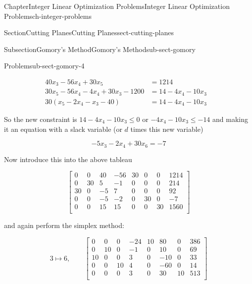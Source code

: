 \documentclass[oneside,10pt,]{book}
\numberwithin{equation}{section}
\newcommand{\amp}{&}
\begin{document}
\begin{chapterptx}{Chapter}{Integer Linear Optimization Problems}{}{Integer Linear Optimization Problems}{}{}{ch-integer-problems}
\begin{sectionptx}{Section}{Cutting Planes}{}{Cutting Planes}{}{}{sect-cutting-planes}
\begin{subsectionptx}{Subsection}{Gomory's Method}{}{Gomory's Method}{}{}{sub-sect-gomory}
\begin{problem}{Problem}{}{sub-sect-gomory-4}
\par
%
\begin{align*}
40 x_3-56 x_4 + 30 x_5 \amp = 1214 \\
30 x_5 -56x_4 -4 x_4 + 30 x_3 - 1200 \amp = 14 - 4x_4 - 10 x_3 \\
30 (x_5 - 2x_4 -x_3 -40) \amp = 14 - 4 x_4 - 10 x_3 \amp
\end{align*}
%
\par
So the new constraint is \(14 - 4 x_{4} - 10 x_{3} \leq 0\) or \(-4 x_{4} -10x_{3} \leq -14\) and making it an equation with a slack variable (or \(d\) times this new variable)%
\par
%
\begin{equation*}
-5 x_3 - 2x_4 + 30 x_6 = -7
\end{equation*}
%
\par
Now introduce this into the above tableau%
\par
%
\begin{equation*}
\left[\begin{array}{rr|rrrrr|r} 0 \amp 0 \amp 40 \amp -56 \amp 30 \amp 0 \amp 0 \amp 1214\\ 0 \amp 30 \amp 5 \amp -1 \amp 0 \amp 0 \amp 0 \amp 214\\ 30 \amp 0 \amp -5 \amp 7 \amp 0 \amp 0 \amp 0 \amp 92\\ 0 \amp 0 \amp -5 \amp -2 \amp 0 \amp 30 \amp 0 \amp -7\\ \hline 0 \amp 0 \amp 15 \amp 15 \amp 0 \amp 0 \amp 30 \amp 1560\\ \end{array} \right]
\end{equation*}
%
\par
and again perform the simplex method:%
\par
%
\begin{equation*}
3 \mapsto 6, \qquad \left[\begin{array}{rr|rrrrr|r} 0 \amp 0 \amp 0 \amp -24 \amp 10 \amp 80 \amp 0 \amp 386\\ 0 \amp 10 \amp 0 \amp -1 \amp 0 \amp 10 \amp 0 \amp 69\\ 10 \amp 0 \amp 0 \amp 3 \amp 0 \amp -10 \amp 0 \amp 33\\ 0 \amp 0 \amp 10 \amp 4 \amp 0 \amp -60 \amp 0 \amp 14\\ \hline 0 \amp 0 \amp 0 \amp 3 \amp 0 \amp 30 \amp 10 \amp 513\\ \end{array} \right]
\end{equation*}
%
\par

\end{problem}
\end{subsectionptx}
\end{sectionptx}
\end{chapterptx}
\end{document}
